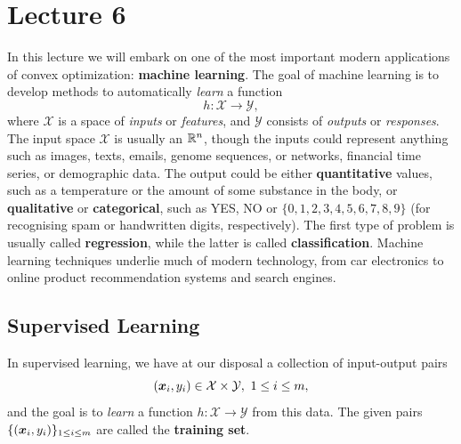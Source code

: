 %
%
% 


\chapter*{Lecture 6}
\setcounter{chapter}{6}
\setcounter{section}{0}
\setcounter{equation}{0}
\setcounter{theorem}{0}

In this lecture we will embark on one of the most important modern applications of convex optimization: \textbf{machine learning}. The goal of machine learning is to develop methods to automatically {\em learn} a function
\begin{equation*}
 h\colon \mathcal{X}\to \mathcal{Y},
\end{equation*}
where $\mathcal{X}$ is a space of {\em inputs} or {\em features}, and $\mathcal{Y}$ consists of {\em outputs} or {\em responses}. The input space $\mathcal{X}$ is usually an $\mathbb{R}^n$, though the inputs could represent anything such as images, texts, emails, genome sequences, or networks, financial time series, or demographic data. The output could be either \textbf{quantitative} values, such as a temperature or the amount of some substance in the body, or \textbf{qualitative} or \textbf{categorical}, such as {YES, NO} or $\{0,1,2,3,4,5,6,7,8,9\}$ (for recognising spam or handwritten digits, respectively). The first type of problem is usually called \textbf{regression}, while the latter is called \textbf{classification}. Machine learning techniques underlie much of modern technology, from car electronics to online product recommendation systems and search engines.

\section{Supervised Learning}
In supervised learning, we have at our disposal a collection of input-output pairs
\begin{equation*}
  (\bm{x}_i, y_i) \in \mathcal{X}\times \mathcal{Y}, \ 1\leq i\leq m,
\end{equation*}
and the goal is to {\em learn} a function $h\colon \mathcal{X}\to \mathcal{Y}$ from this data. 
The given pairs $\{(\bm{x}_i,y_i)\}_{1\leq i\leq m}$ are called the \textbf{training set}.

